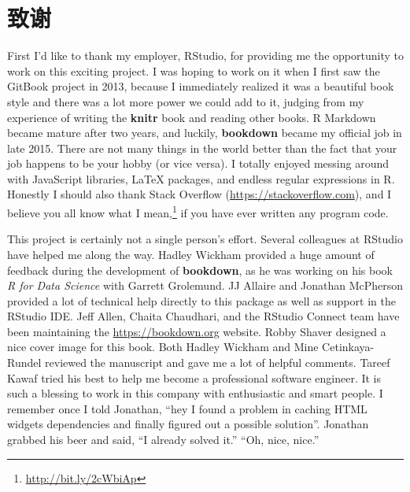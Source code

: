 \documentclass[
  12pt,
]{krantz}
\renewcommand{\href}[2]{#2\footnote{\url{#1}}}
\theoremstyle{definition}
\theoremstyle{definition}
\theoremstyle{definition}
\theoremstyle{definition}
\theoremstyle{remark}
\begin{document}
\hypertarget{ux81f4ux8c22}{%
\section*{致谢}\label{ux81f4ux8c22}}


First I'd like to thank my employer, RStudio, for providing me the opportunity to work on this exciting project. I was hoping to work on it when I first saw the GitBook project in 2013, because I immediately realized it was a beautiful book style and there was a lot more power we could add to it, judging from my experience of writing the \textbf{knitr} book \citep{xie2015} and reading other books. R Markdown became mature after two years, and luckily, \textbf{bookdown} became my official job in late 2015. There are not many things in the world better than the fact that your job happens to be your hobby (or vice versa). I totally enjoyed messing around with JavaScript libraries, LaTeX packages, and endless regular expressions in R. Honestly I should also thank Stack Overflow (\url{https://stackoverflow.com}), and I believe you all know \href{http://bit.ly/2cWbiAp}{what I mean,} if you have ever written any program code.

This project is certainly not a single person's effort. Several colleagues at RStudio have helped me along the way. Hadley Wickham provided a huge amount of feedback during the development of \textbf{bookdown}, as he was working on his book \emph{R for Data Science} with Garrett Grolemund. JJ Allaire and Jonathan McPherson provided a lot of technical help directly to this package as well as support in the RStudio IDE. Jeff Allen, Chaita Chaudhari, and the RStudio Connect team have been maintaining the \url{https://bookdown.org} website. Robby Shaver designed a nice cover image for this book. Both Hadley Wickham and Mine Cetinkaya-Rundel reviewed the manuscript and gave me a lot of helpful comments. Tareef Kawaf tried his best to help me become a professional software engineer. It is such a blessing to work in this company with enthusiastic and smart people. I remember once I told Jonathan, ``hey I found a problem in caching HTML widgets dependencies and finally figured out a possible solution''. Jonathan grabbed his beer and said, ``I already solved it.'' ``Oh, nice, nice.''
\end{document}

